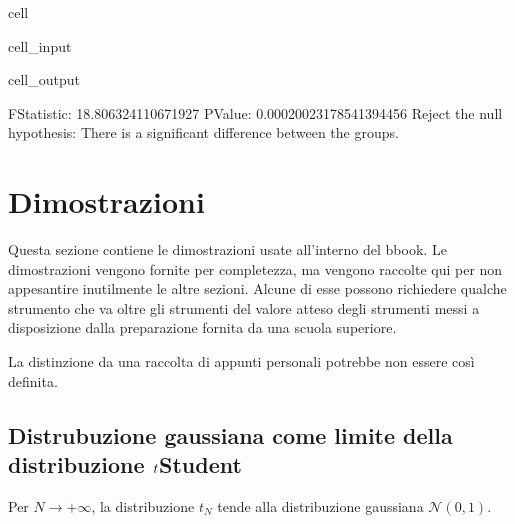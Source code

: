 \documentclass[letterpaper,10pt,italian]{jupyterBook}
\begin{document}
\begin{sphinxuseclass}{cell}
\begin{sphinxVerbatimInput}
\begin{sphinxuseclass}{cell_input}
\begin{sphinxVerbatim}[commandchars=\\\{\}]
  
   
\end{sphinxVerbatim}

\end{sphinxuseclass}\end{sphinxVerbatimInput}
\begin{sphinxVerbatimOutput}

\begin{sphinxuseclass}{cell_output}
\begin{sphinxVerbatim}[commandchars=\\\{\}]
F\PYGZhy{}Statistic: 18.806324110671927
P\PYGZhy{}Value: 0.00020023178541394456
Reject the null hypothesis: There is a significant difference between the groups.
\end{sphinxVerbatim}

\end{sphinxuseclass}\end{sphinxVerbatimOutput}

\end{sphinxuseclass}
\sphinxstepscope


\chapter{Dimostrazioni}
\label{\detokenize{ch/proofs:dimostrazioni}}\label{\detokenize{ch/proofs:statistics-hs-proofs}}\label{\detokenize{ch/proofs::doc}}
\sphinxAtStartPar
Questa sezione contiene le dimostrazioni usate all’interno del bbook. Le dimostrazioni vengono fornite per completezza, ma vengono raccolte qui per non appesantire inutilmente le altre sezioni. Alcune di esse possono richiedere qualche strumento che va oltre gli strumenti del valore atteso degli strumenti messi a disposizione dalla preparazione fornita da una scuola superiore.

\sphinxAtStartPar
La distinzione da una raccolta di appunti personali potrebbe non essere così definita.


\section{Distrubuzione gaussiana come limite della distribuzione \protect\(t\protect\)\sphinxhyphen{}Student}
\label{\detokenize{ch/proofs:distrubuzione-gaussiana-come-limite-della-distribuzione-t-student}}
\sphinxAtStartPar
Per \(N \rightarrow +\infty\), la distribuzione \(t_N\) tende alla distribuzione gaussiana \(\mathscr{N}(0,1)\).
\end{document}
